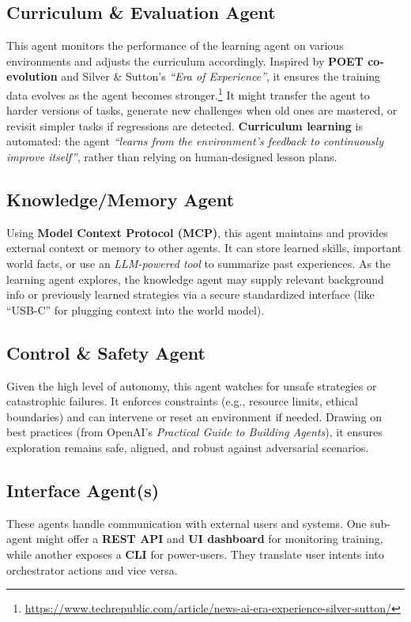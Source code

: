 \documentclass{article}
\begin{document}
\subsection{Curriculum \& Evaluation Agent}
This agent monitors the performance of the learning agent on various environments and adjusts the curriculum accordingly. Inspired by \textbf{POET co-evolution} and Silver \& Sutton’s \emph{“Era of Experience”}, it ensures the training data evolves as the agent becomes stronger.\footnote{\url{https://www.techrepublic.com/article/news-ai-era-experience-silver-sutton/}} It might transfer the agent to harder versions of tasks, generate new challenges when old ones are mastered, or revisit simpler tasks if regressions are detected. \textbf{Curriculum learning} is automated: the agent \emph{“learns from the environment’s feedback to continuously improve itself”}, rather than relying on human-designed lesson plans.

\subsection{Knowledge/Memory Agent}
Using \textbf{Model Context Protocol (MCP)}, this agent maintains and provides external context or memory to other agents. It can store learned skills, important world facts, or use an \emph{LLM-powered tool} to summarize past experiences. As the learning agent explores, the knowledge agent may supply relevant background info or previously learned strategies via a secure standardized interface (like “USB-C” for plugging context into the world model).

\subsection{Control \& Safety Agent}
Given the high level of autonomy, this agent watches for unsafe strategies or catastrophic failures. It enforces constraints (e.g., resource limits, ethical boundaries) and can intervene or reset an environment if needed. Drawing on best practices (from OpenAI’s \emph{Practical Guide to Building Agents}), it ensures exploration remains safe, aligned, and robust against adversarial scenarios.

\subsection{Interface Agent(s)}
These agents handle communication with external users and systems. One sub-agent might offer a \textbf{REST API} and \textbf{UI dashboard} for monitoring training, while another exposes a \textbf{CLI} for power-users. They translate user intents into orchestrator actions and vice versa.
\end{document}

